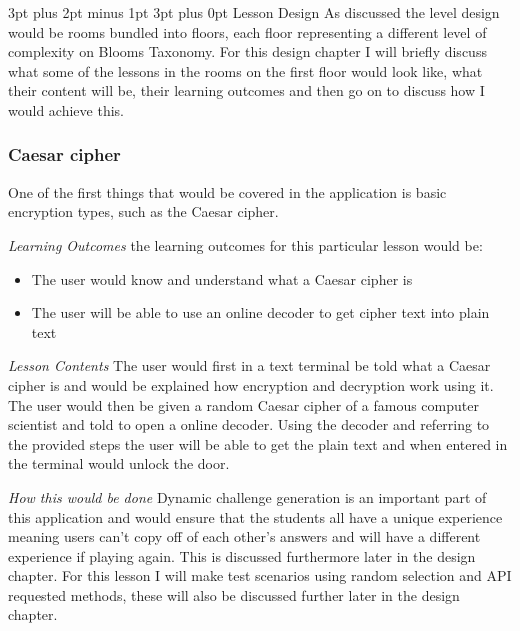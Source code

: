 \documentclass[12pt,a4paper]{article}
\makeatletter
\renewcommand\subsection{\@startsection {subsection}{1}{2mm} %
                               {3pt plus 2pt minus 1pt} %
                               {3pt plus 0pt} %
                               {\normalfont\bfseries}}
\makeatother
\begin{document}
\subsection{Lesson Design}  
As discussed the level design would be rooms bundled into floors, each floor representing a different level of complexity on Blooms Taxonomy. For this design chapter I will briefly discuss what some of the lessons in the rooms on the first floor would look like, what their content will be, their learning outcomes and then go on to discuss how I would achieve this. 
\subsubsection{Caesar cipher} 
One of the first things that would be covered in the application is basic encryption types, such as the Caesar cipher.  

\emph{Learning Outcomes} 
\newline the learning outcomes for this particular lesson would be:  

\begin{itemize}\itemsep0pt
	\item The user would know and understand what a Caesar cipher is 
	\item The user will be able to use an online decoder to get cipher text into plain text
\end{itemize} 

\emph{Lesson Contents} 
\newline The user would first in a text terminal be told what a Caesar cipher is and would be explained how encryption and decryption work using it. The user would then be given a random Caesar cipher of a famous computer scientist and told to open a online decoder. Using the decoder and referring to the provided steps the user will be able to get the plain text and when entered in the terminal would unlock the door.  

\emph{How this would be done} 
\newline Dynamic challenge generation is an important part of this application and would ensure that the students all have a unique experience meaning users can't copy off of each other's answers and will have a different experience if playing again. This is discussed furthermore later in the design chapter. For this lesson I will make test scenarios using random selection and API requested methods, these will also be discussed further later in the design chapter. 
\end{document}
